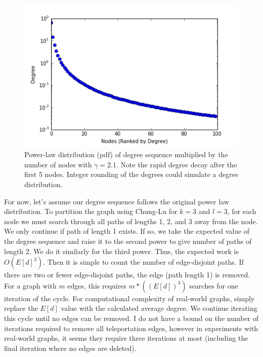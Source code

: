 \documentclass{article}
\begin{document}
\begin{figure}[H]
\begin{center}
\includegraphics[width=\linewidth]{powerlawdeg.png}
  \caption{Power-law distribution (pdf) of degree sequence multiplied by the number of nodes with $\gamma = 2.1$. Note the rapid degree decay after the first 5 nodes. Integer rounding of the degrees could simulate a degree distribution.}
  \end{center}
  \end{figure}

For now, let's assume our degree sequence follows the original power law distribution. To partition the graph using Chung-Lu for $k = 3$ and $l = 3$, for each node we must search through all paths of lengths 1, 2, and 3 away from the node. We only continue if path of length 1 exists. If so, we take the expected value of the degree sequence and raise it to the second power to give number of paths of length 2. We do it similarly for the third power. Thus, the expected work is $O(E[d]^3)$. Then it is simple to count the number of edge-disjoint paths. If there are two or fewer edge-disjoint paths, the edge (path length 1) is removed. For a graph with $m$ edges, this requires $m*((E[d])^{3})$ searches for one iteration of the cycle. For computational complexity of real-world graphs, simply replace the $E[d]$ value with the calculated average degree. We continue iterating this cycle until no edges can be removed. I do not have a bound on the number of iterations required to remove all teleportation edges, however in experiments with real-world graphs, it seems they require three iterations at most (including the final iteration where no edges are deleted).
\end{document}
